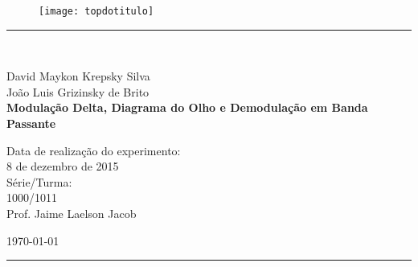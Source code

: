 \begin{titlepage}
\begin{center}
\begin{figure}[h]
\texttt{[image: topdotitulo]}
\end{figure}
\rule{\columnwidth}{1.5mm}
\

\large David Maykon Krepsky Silva \\
\large João Luis Grizinsky de Brito \\

\vspace{4cm}
{\bf \Large Modulação Delta, Diagrama do Olho e Demodulação em Banda Passante}
\vspace{3.5cm}

\begin{flushright}
Data de realização do experimento:\\
8 de dezembro de 2015\\
Série/Turma:\\
1000/1011\\
Prof. Jaime Laelson Jacob
\end{flushright}

\vspace{3.2cm}
\today

\rule{\columnwidth}{1.3mm}
\end{center}
\end{titlepage}